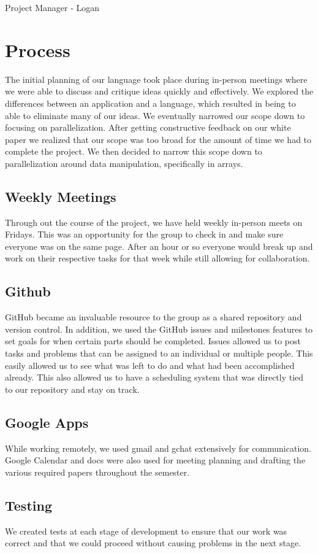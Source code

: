 Project Manager - Logan

\section{Process}
The initial planning of our language took place during in-person
meetings where we were able to discuss and critique ideas quickly and
effectively. We explored the differences between an application and a
language, which resulted in being to able to eliminate many of our ideas. We
eventually narrowed our scope down to focusing on
parallelization. After getting constructive feedback on our white
paper we realized that our scope was too broad for the amount of time
we had to complete the project. We then decided to narrow this scope
down to parallelization around data manipulation, specifically in
arrays.
\subsection{Weekly Meetings}
Through out the course of the project, we have held weekly in-person
meets on Fridays. This was an opportunity for the group to check in
and make sure everyone was on the same page. After an hour or so
everyone would break up and work on their respective tasks for that
week while still allowing for collaboration.
\subsection{Github}
GitHub became an invaluable resource to the group as a shared
repository and version control. In addition, we used the GitHub issues
and milestones features to set goals for when certain parts should be
completed.  Issues allowed us to post tasks and problems that can be
assigned to an individual or multiple people. This easily allowed us
to see what was left to do and what had been accomplished already. This also
allowed us to have a scheduling system that was directly tied to our
repository and stay on track.
\subsection{Google Apps}
While working remotely, we used gmail and gchat extensively for
communication. Google Calendar and docs were also used for meeting
planning and drafting the various required papers throughout the
semester.
\subsection{Testing}
We created tests at each stage of development to ensure that our work
was correct and that we could proceed without causing problems in the
next stage.

